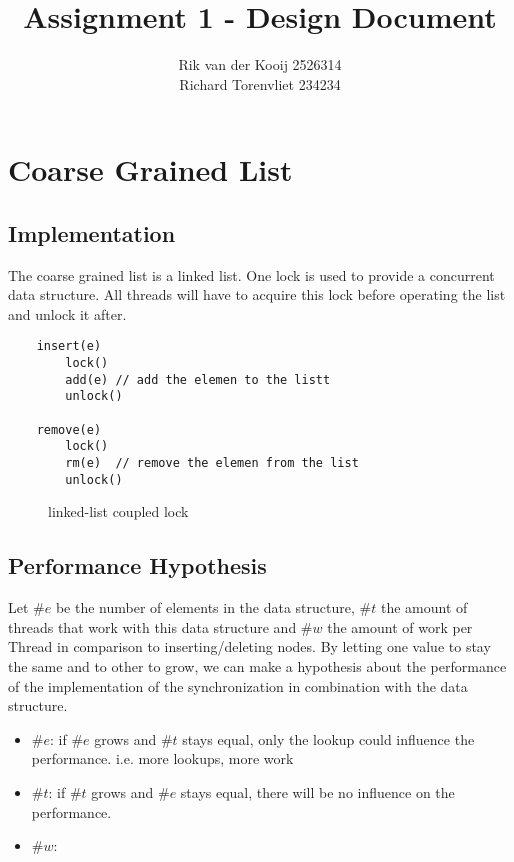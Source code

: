 \documentclass[10pt,a4paper]{article}
\author{Rik van der Kooij 2526314\\Richard Torenvliet 234234}
\title{Assignment 1 - Design Document}
\begin{document}
\maketitle



\section{Coarse Grained List}
\subsection{Implementation}
    The coarse grained list is a linked list. One lock is used to provide a concurrent data structure. All threads will have to acquire this lock before operating the list and unlock it after. 
   
\begin{lstlisting}
    insert(e) 
        lock()
        add(e) // add the elemen to the listt
        unlock()

    remove(e)
        lock()
        rm(e)  // remove the elemen from the list
        unlock()
\end{lstlisting}

\begin{figure}[!h]
\centerline{
}
\caption{linked-list coupled lock}
\end{figure}
    
\subsection{Performance Hypothesis}
Let $\#e$ be the number of elements in the data structure, $\#t$ the amount of threads
that work with this data structure and $\#w$ the amount of work per Thread in
comparison to inserting/deleting nodes. By letting one value to stay the same
and to other to grow, we can make a hypothesis about the performance of the
implementation of the synchronization in combination with the data structure.
\begin{itemize}
\item $\#e$: if $\#e$ grows and $\#t$ stays equal, only the lookup could influence the performance.
    i.e. more lookups, more work
 \item $\#t$: if $\#t$ grows and $\#e$ stays equal, there will be no influence on the performance.
 \item $\#w$: 
\end{itemize}
\end{document}
